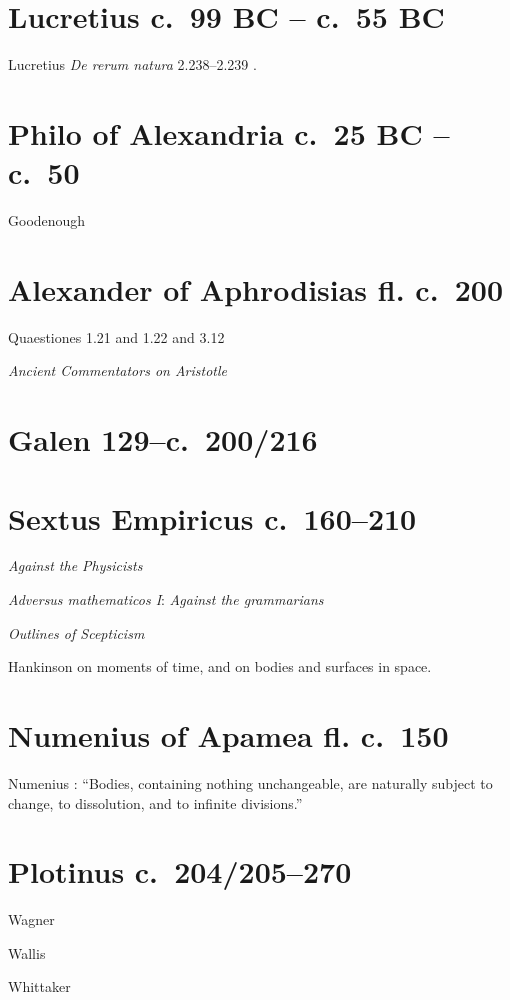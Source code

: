 \documentclass{article}
\begin{document}
\section{Lucretius c.~99 BC -- c.~55 BC}
Lucretius {\em De rerum natura} 2.238--2.239 \cite{melville}.

\section{Philo of Alexandria c.~25 BC -- c.~50}
Goodenough \cite[pp.~127--139]{goodenough}

\section{Alexander of Aphrodisias fl. c.~200}
Quaestiones 1.21 and 1.22 \cite[pp.~74--75]{quaestiones11} and 3.12 \cite[p.~67]{quaestiones216}

{\em Ancient Commentators on Aristotle}


\section{Galen 129--c.~200/216}

\section{Sextus Empiricus c.~160--210}
{\em Against the Physicists} \cite{bett}

{\em Adversus mathematicos I}: {\em Against the grammarians} \cite[pp.~8, 61, 166]{blank}

{\em Outlines of Scepticism} \cite{annas}

Hankinson \cite{sceptics} on moments of time, and on bodies and surfaces in space.

\section{Numenius of Apamea fl. c.~150}
Numenius \cite[p.~58]{numenius}: ``Bodies, containing nothing unchangeable, are naturally subject to change, to dissolution,
and to infinite divisions.''

\section{Plotinus c.~204/205--270}
Wagner \cite{wagner}

Wallis \cite{wallis}

Whittaker \cite{whittaker}
\end{document}
